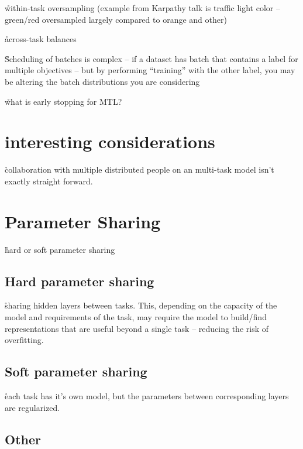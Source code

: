 \r{within-task oversampling (example from Karpathy talk is traffic light color -- green/red oversampled largely compared to orange and other)} 

\r{across-task balances}

\r{Scheduling of batches is complex -- if a dataset has batch that contains a label for multiple objectives -- but by performing ``training'' with the other label, you may be altering the batch distributions you are considering}

\r{what is early stopping for MTL?}

\section{interesting considerations}

\r{collaboration with multiple distributed people on an multi-task model isn't exactly straight forward.}

\section{Parameter Sharing}

\r{hard or soft parameter sharing}

\subsection{Hard parameter sharing}

\r{sharing hidden layers between tasks. This, depending on the capacity of the model and requirements of the task, may require the model to build/find representations that are useful beyond a single task -- reducing the risk of overfitting.}


\subsection{Soft parameter sharing}

\r{each task has it's own model, but the parameters between corresponding layers are regularized.}


\subsection{Other}

